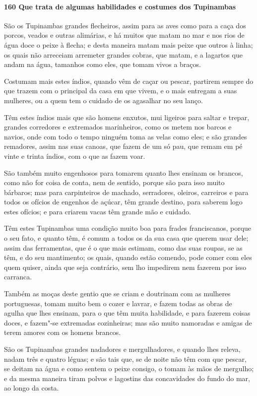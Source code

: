 \begin{linenumbers}
\paragraph{160 Que trata de algumas habilidades e costumes dos Tupinambas}\quad
São os Tupinambas grandes flecheiros, assim para as aves como para a caça dos porcos,
veados e outras alimárias, e há muitos que matam no mar e nos rios de água doce o peixe à
flecha; e desta maneira matam mais peixe que outros à linha; os quais não arreceiam
arremeter grandes cobras, que matam, e a lagartos que andam na água, tamanhos como eles,
que tomam vivos a braços.

Costumam mais estes índios, quando vêm de caçar ou pescar, partirem sempre do que trazem
com o principal da casa em que vivem, e o mais entregam a suas mulheres, ou a quem tem o
cuidado de os agasalhar no seu lanço.

Têm estes índios mais que são homens enxutos, mui ligeiros para saltar e trepar, grandes
corredores e extremados marinheiros, como os metem nos barcos e navios, onde com todo o
tempo ninguém toma as velas como eles; e são grandes remadores, assim nas suas canoas, que
fazem de um só pau, que remam em pé vinte e trinta índios, com o que as fazem voar.

São também muito engenhosos para tomarem quanto lhes ensinam os brancos, como não for
coisa de conta, nem de sentido, porque são para isso muito bárbaros; mas para carpinteiros
de machado, serradores, oleiros, carreiros e para todos os ofícios de engenhos de açúcar,
têm grande destino, para saberem logo estes ofícios; e para criarem vacas têm grande mão e
cuidado.

Têm estes Tupinambas uma condição muito boa para frades franciscanos, porque o seu fato, e
quanto têm, é comum a todos os da sua casa que querem usar dele; assim das ferramentas,
que é o que mais estimam, como das suas roupas, se as têm, e do seu mantimento; os quais,
quando estão comendo, pode comer com eles quem quiser, ainda que seja contrário, sem lho
impedirem nem fazerem por isso carranca.

Também as moças deste gentio que se criam e doutrinam com as mulheres portuguesas, tomam
muito bem o cozer e lavrar, e fazem todas as obras de agulha que lhes ensinam, para o que
têm muita habilidade, e para fazerem coisas doces, e fazem"-se extremadas cozinheiras; mas
são muito namoradas e amigas de terem amores com os homens brancos.

São os Tupinambas grandes nadadores e mergulhadores, e quando lhes releva, nadam três e
quatro léguas; e são tais que, se de noite não têm com que pescar, se deitam na água e
como sentem o peixe consigo, o tomam às mãos de mergulho; e da mesma maneira tiram polvos
e lagostins das concavidades do fundo do mar, ao longo da costa.


\end{linenumbers}
